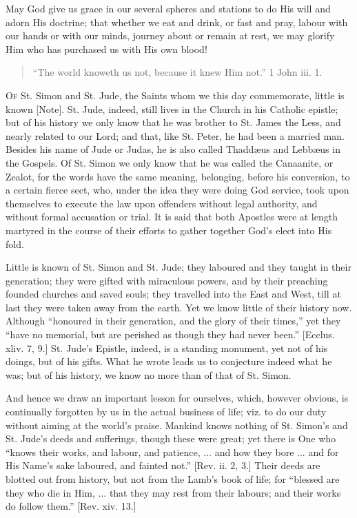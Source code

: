 May God give us grace in our several spheres and stations to do His
will and adorn His doctrine; that whether we eat and drink, or fast
and pray, labour with our hands or with our minds, journey about or
remain at rest, we may glorify Him who has purchased us with His own
blood!


\begin{quote}

``The world knoweth us not, because it knew Him not.'' 1 John
iii. 1.

\end{quote}

O\textsc{f} St. Simon and St. Jude, the Saints whom we this day commemorate,
little is known [Note]. St. Jude, indeed, still lives in the Church
in his Catholic epistle; but of his history we only know that he was
brother to St. James the Less, and nearly related to our Lord; and
that, like St. Peter, he had been a married man. Besides his name of
Jude or Judas, he is also called Thaddæus and Lebbæus in the Gospels.
Of St. Simon we only know that he was called the Canaanite, or Zealot,
for the words have the same meaning, belonging, before his conversion,
to a certain fierce sect, who, under the idea they were doing God
service, took upon themselves to execute the law upon offenders
without legal authority, and without formal accusation or trial. It is
said that both Apostles were at length martyred in the course of their
efforts to gather together God's elect into His fold.

Little is known of St. Simon and St. Jude; they laboured and they
taught in their generation; they were gifted with miraculous powers,
and by their preaching founded churches and saved souls; they
travelled into the East and West, till at last they were taken away
from the earth. Yet we know little of their history now. Although
``honoured in their generation, and the glory of their
times,'' yet they ``have no memorial, but are perished as
though they had never been.'' [Ecclus. xliv. 7, 9.] St. Jude's
Epistle, indeed, is a standing monument, yet not of his doings, but of
his gifts. What he wrote leads us to conjecture indeed what he was;
but of his history, we know no more than of that of St. Simon.

And hence we draw an important lesson for ourselves, which, however
obvious, is continually forgotten by us in the actual business of
life; viz. to do our duty without aiming at the world's praise.
Mankind knows nothing of St. Simon's and St. Jude's deeds and
sufferings, though these were great; yet there is One who ``knows
their works, and labour, and patience, ... and how they bore ... and
for His Name's sake laboured, and fainted not.'' [Rev. ii. 2, 3.]
Their deeds are blotted out from history, but not from the Lamb's book
of life; for ``blessed are they who die in Him, ... that they
may rest from their
labours; and their works do follow them.'' [Rev. xiv. 13.]

